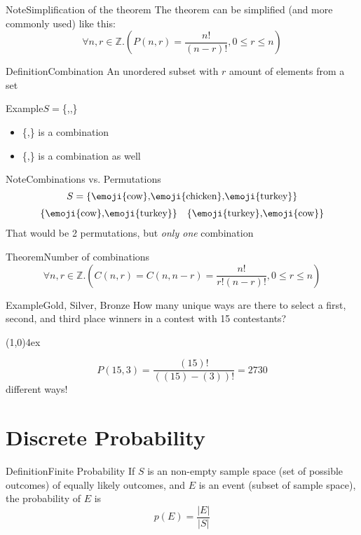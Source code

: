 \documentclass{MathNotes}
\newenvironment{example}[1]{\begin{BlueBox}{Example}{#1}}{\end{BlueBox}}
\newenvironment{definition}[1]{\begin{RedBox}{Definition}{#1}}{\end{RedBox}}
\newenvironment{note}[1]{\begin{YellowBox}{Note}{#1}}{\end{YellowBox}}
\newenvironment{theorem}[1]{\begin{GrayBox}{Theorem}{#1}}{\end{GrayBox}}
\newcommand{\br}{
	\begin{center}
		\line(1,0){4ex}
	\end{center}
}
\begin{document}
\begin{note}{Simplification of the theorem}\label{note:permutations-equation}
	The theorem can be simplified (and more commonly used) like this:
	\[\forall n,r\in\mathbb{Z}.\left(P(n,r)=\frac{n!}{(n-r)!},0\leq r\leq n\right)\]
\end{note}
\begin{multicols}{2}
	\begin{definition}{Combination}\label{def:combination}
		An unordered subset with $r$ amount of elements from a set
	\end{definition}
	\begin{example}{$S=$\{,,\}}\label{ex:combination}
		\begin{itemize}
			\item \{,\} is a combination
			\item \{,\} is a combination as well
		\end{itemize}
	\end{example}
\end{multicols}

\begin{note}{Combinations vs. Permutations}\label{note:combinations-permutations-difference}
	\[S=\{\text{\emoji{cow},\emoji{chicken},\emoji{turkey}}\}\]
	\begin{align*}
		\{\text{\emoji{cow},\emoji{turkey}}\} &  & \{\text{\emoji{turkey},\emoji{cow}}\}
	\end{align*}
	That would be 2 permutations, but \textit{only one} combination
\end{note}

\begin{theorem}{Number of combinations}\label{th:combinations-equation}
	\[\forall n,r\in\mathbb{Z}.\left(C(n,r)=C(n,n-r)=\frac{n!}{r!\left(n-r\right)!},0\leq r\leq n\right)\]
\end{theorem}

\begin{example}{Gold, Silver, Bronze}\label{ex:permutations}
	How many unique ways are there to select a first, second, and third place
	winners in a contest with 15 contestants?
	\br
	\[P(15,3)=\frac{(15)!}{\left((15)-(3)\right)!}=2730\]
	different ways!
\end{example}

\section{Discrete Probability}\label{sec:discrete-probability}
\begin{definition}{Finite Probability}\label{def:finite-probability}
	If $S$ is an non-empty sample space (set of possible outcomes) of equally
	likely outcomes, and $E$ is an event (subset of sample space), the
	probability of $E$ is \[p(E)=\frac{|E|}{|S|}\]
\end{definition}
\end{document}
